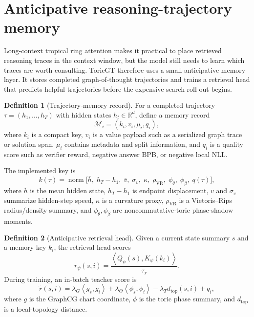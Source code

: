\documentclass[11pt]{article}
\theoremstyle{definition}
\newtheorem{definition}{Definition}[section]
\theoremstyle{plain}
\theoremstyle{remark}
\numberwithin{equation}{section}
\newcommand{\R}{\mathbb{R}}
\newcommand{\ip}[2]{\left\langle #1,#2\right\rangle}
\begin{document}
\section{Anticipative reasoning-trajectory memory}

Long-context tropical ring attention makes it practical to place retrieved reasoning traces in the context window, but the model still needs to learn which traces are worth consulting.  ToricGT therefore uses a small anticipative memory layer.  It stores completed graph-of-thought trajectories and trains a retrieval head that predicts helpful trajectories before the expensive search roll-out begins.

\begin{definition}[Trajectory-memory record]
For a completed trajectory $\tau=(h_1,\ldots,h_T)$ with hidden states $h_t\in\R^d$, define a memory record
\begin{equation}
  \mathcal M_i=(k_i,v_i,\mu_i,q_i),
\end{equation}
where $k_i$ is a compact key, $v_i$ is a value payload such as a serialized graph trace or solution span, $\mu_i$ contains metadata and split information, and $q_i$ is a quality score such as verifier reward, negative answer BPB, or negative local NLL.
\end{definition}

The implemented key is
\begin{equation}
  k(\tau)=\operatorname{norm}\big[
  \bar h,\; h_T-h_1,\; \bar v,\;\sigma_v,\;\kappa,\;\rho_{\mathrm{VR}},\;
  \phi_\theta,\;\phi_\beta,\;q(\tau)
  \big],
\end{equation}
where $\bar h$ is the mean hidden state, $h_T-h_1$ is endpoint displacement, $\bar v$ and $\sigma_v$ summarize hidden-step speed, $\kappa$ is a curvature proxy, $\rho_{\mathrm{VR}}$ is a Vietoris--Rips radius/density summary, and $\phi_\theta,\phi_\beta$ are noncommutative-toric phase-shadow moments.

\begin{definition}[Anticipative retrieval head]
Given a current state summary $s$ and a memory key $k_i$, the retrieval head scores
\begin{equation}
  r_\psi(s,i)=\frac{\ip{Q_\psi(s)}{K_\psi(k_i)}}{\tau_r}.
\end{equation}
During training, an in-batch teacher score is
\begin{equation}
  \widetilde r(s,i)=
  \lambda_G\ip{g_s}{g_i}
  +\lambda_\Theta\ip{\phi_s}{\phi_i}
  -\lambda_T d_{\mathrm{top}}(s,i)+q_i,
\end{equation}
where $g$ is the GraphCG chart coordinate, $\phi$ is the toric phase summary, and $d_{\mathrm{top}}$ is a local-topology distance.
\end{definition}
\end{document}
